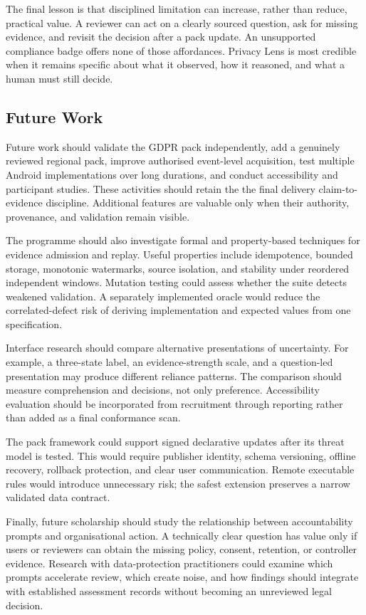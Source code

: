 The final lesson is that disciplined limitation can increase, rather than reduce, practical value. A reviewer can act on a clearly sourced question, ask for missing evidence, and revisit the decision after a pack update. An unsupported compliance badge offers none of those affordances. Privacy Lens is most credible when it remains specific about what it observed, how it reasoned, and what a human must still decide.

\subsection{Future Work}

Future work should validate the GDPR pack independently, add a genuinely reviewed regional pack, improve authorised event-level acquisition, test multiple Android implementations over long durations, and conduct accessibility and participant studies. These activities should retain the the final delivery claim-to-evidence discipline. Additional features are valuable only when their authority, provenance, and validation remain visible.

The programme should also investigate formal and property-based techniques for evidence admission and replay. Useful properties include idempotence, bounded storage, monotonic watermarks, source isolation, and stability under reordered independent windows. Mutation testing could assess whether the suite detects weakened validation. A separately implemented oracle would reduce the correlated-defect risk of deriving implementation and expected values from one specification.

Interface research should compare alternative presentations of uncertainty. For example, a three-state label, an evidence-strength scale, and a question-led presentation may produce different reliance patterns. The comparison should measure comprehension and decisions, not only preference. Accessibility evaluation should be incorporated from recruitment through reporting rather than added as a final conformance scan.

The pack framework could support signed declarative updates after its threat model is tested. This would require publisher identity, schema versioning, offline recovery, rollback protection, and clear user communication. Remote executable rules would introduce unnecessary risk; the safest extension preserves a narrow validated data contract.

Finally, future scholarship should study the relationship between accountability prompts and organisational action. A technically clear question has value only if users or reviewers can obtain the missing policy, consent, retention, or controller evidence. Research with data-protection practitioners could examine which prompts accelerate review, which create noise, and how findings should integrate with established assessment records without becoming an unreviewed legal decision.

